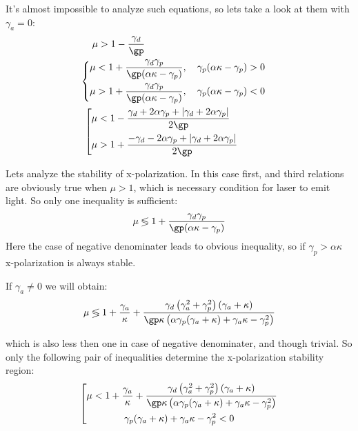 \documentclass[12pt, notitlepage]{report}
\begin{document}
It's almost impossible to analyze such equations, so lets take a look at them with $\gamma_a = 0$:
\begin{align}
		&\mu > 1 - \frac{\gamma_d}{\gp} \\
		&\hspace{-13pt} \left\{ \begin{aligned}
			\mu &< 1 + \frac{\gamma_d\gamma_p}{\gp (\alpha\kappa - \gamma_p)},\quad \gamma_p(\alpha\kappa - \gamma_p) > 0 \\
			\mu &> 1 + \frac{\gamma_d\gamma_p}{\gp (\alpha\kappa - \gamma_p)},\quad \gamma_p(\alpha\kappa - \gamma_p) < 0
		\end{aligned}\right.\\
		& \hspace{-9pt} \left[ \begin{aligned}
			\mu &< 1 - \frac{\gamma_d + 2 \alpha  \gamma_p+| \gamma_d+2 \alpha  \gamma_p|}{2 \gp } \\
			\mu &> 1 + \frac{-\gamma_d -2 \alpha  \gamma_p+| \gamma_d+2 \alpha  \gamma_p|}{2 \gp }
		\end{aligned}\right.
\end{align}

Lets analyze the stability of x-polarization. In this case first, and third relations are obviously true when $\mu > 1$, which is necessary condition for laser to emit light. So only one inequality is sufficient:
\begin{equation}
	\mu \lessgtr 1 + \frac{\gamma_d\gamma_p}{\gp (\alpha\kappa - \gamma_p)}
\end{equation}
Here the case of negative denominater leads to obvious inequality, so if $\gamma_p > \alpha\kappa$ x-polarization is always stable.

If $\gamma_a \ne 0$ we will obtain:
\begin{equation}
	\mu \lessgtr 1 + \frac{\gamma_a}{\kappa } +  \frac{\gamma_d \left(\gamma_a^2+\gamma_p^2\right) (\gamma_a+\kappa )}{\gp  \kappa  \left(\alpha \gamma_p (\gamma_a + \kappa)+ \gamma_a \kappa -\gamma_p^2\right)}
\end{equation}

which is also less then one in case of negative denominater, and though trivial. So only the following pair of inequalities determine the x-polarization stability region:
\begin{equation}
	\left[\begin{split}
		\mu < 1 + \frac{\gamma_a}{\kappa } &+  \frac{\gamma_d \left(\gamma_a^2+\gamma_p^2\right) (\gamma_a+\kappa )}{\gp  \kappa  \left(\alpha \gamma_p (\gamma_a + \kappa)+ \gamma_a \kappa -\gamma_p^2\right)}\\
		\gamma_p &(\gamma_a+\kappa )+\gamma_a \kappa -\gamma_p^2 < 0
	\end{split}	\right.
\end{equation}
\end{document}
